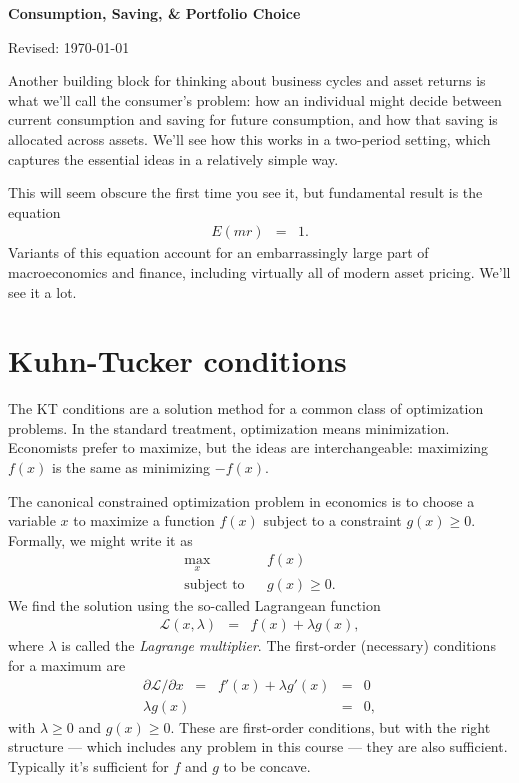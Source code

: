 

\centerline{\Large \bf Consumption, Saving, \& Portfolio Choice}
\centerline{Revised: \today}

\medskip
Another building block for thinking about business cycles
and asset returns is what we'll call the consumer's problem:
how an individual might decide between current consumption
and saving for future consumption,
and how that saving is allocated across assets.
We'll see how this works in a two-period setting,
which captures the essential ideas in a relatively simple way.

This will seem obscure the first time you see it,
but fundamental result is the equation
\begin{eqnarray}
    E (mr) &=& 1 .
    \label{eq:E(mr)=1}
\end{eqnarray}
Variants of this equation account for
an embarrassingly large part of macroeconomics and finance,
including virtually all of modern asset pricing.
We'll see it a lot.


\section{Kuhn-Tucker conditions}

The KT conditions are a solution method for a common class of optimization problems.
In the standard treatment, optimization means minimization.
Economists prefer to maximize, but the ideas are interchangeable:
maximizing $f(x)$ is the same as minimizing $-f(x)$.

The canonical constrained optimization problem in economics
is to choose a variable $x$ to maximize a function
$f(x)$ subject to a constraint $g(x) \geq 0$.
Formally, we might write it as
\begin{eqnarray*}
    \max_x && f(x) \\
    \mbox{subject to} && g(x) \geq 0 .
\end{eqnarray*}
We find the solution using the so-called Lagrangean function
\begin{eqnarray*}
    \mathcal{L}(x,\lambda) &=& f(x) + \lambda g(x) ,
\end{eqnarray*}
where $\lambda$ is called the {\it Lagrange multiplier\/}.
The first-order (necessary) conditions for a maximum are
\begin{eqnarray*}
   \partial \mathcal{L}/\partial x \;\;=\;\; f'(x) + \lambda g'(x) &=&  0 \\
   \lambda g(x) &=& 0 ,
\end{eqnarray*}
with  $\lambda \geq 0$ and $g(x) \geq 0$.
These are first-order conditions,
but with the right structure --- which includes any problem in this course ---
they are also sufficient.
Typically it's sufficient for $f$ and $g$ to be concave.

